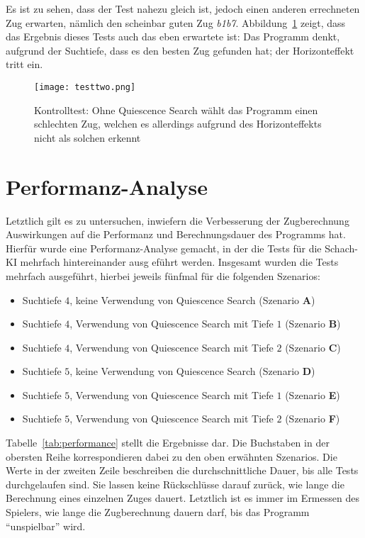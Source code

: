 Es ist zu sehen, dass der Test nahezu gleich ist, jedoch einen anderen errechneten Zug erwarten, nämlich den scheinbar guten Zug \textit{b1b7}. Abbildung~\ref{fig:testtwo} zeigt, dass das Ergebnis dieses Tests auch das eben erwartete ist: Das Programm denkt, aufgrund der Suchtiefe, dass es den besten Zug gefunden hat; der Horizonteffekt tritt ein.

\begin{figure}[H]
	\texttt{[image: testtwo.png]}
	\caption{Kontrolltest: Ohne Quiescence Search wählt das Programm einen schlechten Zug, welchen es allerdings aufgrund des Horizonteffekts nicht als solchen erkennt}
	\label{fig:testtwo}
\end{figure}

\section{Performanz-Analyse}
Letztlich gilt es zu untersuchen, inwiefern die Verbesserung der Zugberechnung Auswirkungen auf die Performanz und Berechnungsdauer des Programms hat. Hierfür wurde eine Performanz-Analyse gemacht, in der die Tests für die Schach-KI mehrfach hintereinander ausg eführt werden. Insgesamt wurden die Tests mehrfach ausgeführt, hierbei jeweils fünfmal für die folgenden Szenarios:

\begin{itemize}
	\item Suchtiefe $4$, keine Verwendung von Quiescence Search (Szenario \textbf{A})
	\item Suchtiefe $4$, Verwendung von Quiescence Search mit Tiefe $1$ (Szenario \textbf{B})
	\item Suchtiefe $4$, Verwendung von Quiescence Search mit Tiefe $2$ (Szenario \textbf{C})
	\item Suchtiefe $5$, keine Verwendung von Quiescence Search (Szenario \textbf{D})
	\item Suchtiefe $5$, Verwendung von Quiescence Search mit Tiefe $1$ (Szenario \textbf{E})
	\item Suchtiefe $5$, Verwendung von Quiescence Search mit Tiefe $2$ (Szenario \textbf{F})
\end{itemize}

Tabelle~\ref{tab:performance} stellt die Ergebnisse dar. Die Buchstaben in der obersten Reihe korrespondieren dabei zu den oben erwähnten Szenarios. Die Werte in der zweiten Zeile beschreiben die durchschnittliche Dauer, bis alle Tests durchgelaufen sind. Sie lassen keine Rückschlüsse darauf zurück, wie lange die Berechnung eines einzelnen Zuges dauert. Letztlich ist es immer im Ermessen des Spielers, wie lange die Zugberechnung dauern darf, bis das Programm "`unspielbar"' wird.

